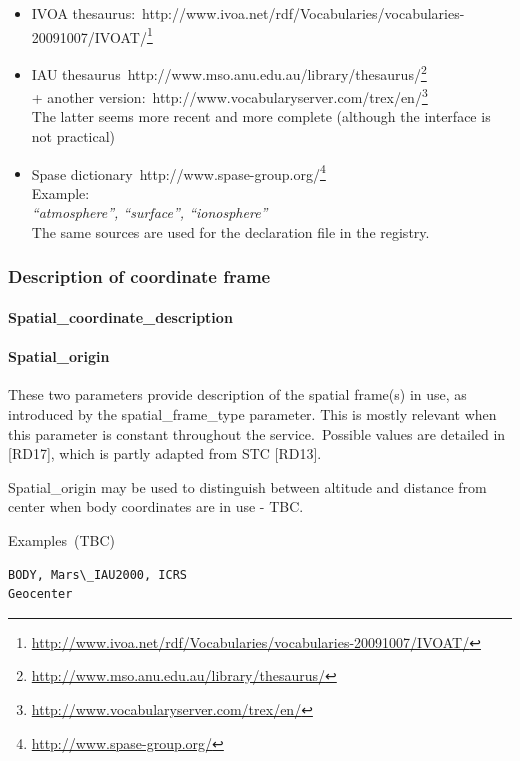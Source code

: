 \documentclass[11pt,a4paper]{ivoa}
\begin{document}
\begin{itemize}
\item IVOA thesaurus: http://www.ivoa.net/rdf/Vocabularies/vocabularies-20091007/IVOAT/\footnote{\url{http://www.ivoa.net/rdf/Vocabularies/vocabularies-20091007/IVOAT/}}
\item IAU thesaurus http://www.mso.anu.edu.au/library/thesaurus/\footnote{\url{http://www.mso.anu.edu.au/library/thesaurus/}}\\+ another version: http://www.vocabularyserver.com/trex/en/\footnote{\url{http://www.vocabularyserver.com/trex/en/}}\\The latter seems more recent and more complete (although the interface is not practical)
\item Spase dictionary http://www.spase-group.org/\footnote{\url{http://www.spase-group.org/}}\\Example: \\\emph{``atmosphere'', ``surface'', ``ionosphere''}\\The same sources are used for the declaration file in the registry.
\end{itemize}

\subsubsection{Description of coordinate frame}

\paragraph{Spatial\_coordinate\_description}

\paragraph{Spatial\_origin}

These two parameters provide description of the spatial frame(s) in use, as introduced by the spatial\_frame\_type parameter. This is mostly relevant when this parameter is constant throughout the service. Possible values are detailed in [RD17], which is partly adapted from STC [RD13].

Spatial\_origin may be used to distinguish between altitude and distance from center when body coordinates are in use - TBC.

Examples (TBC)






\begin{verbatim}BODY, Mars\_IAU2000, ICRS
Geocenter \end{verbatim}
\end{document}
